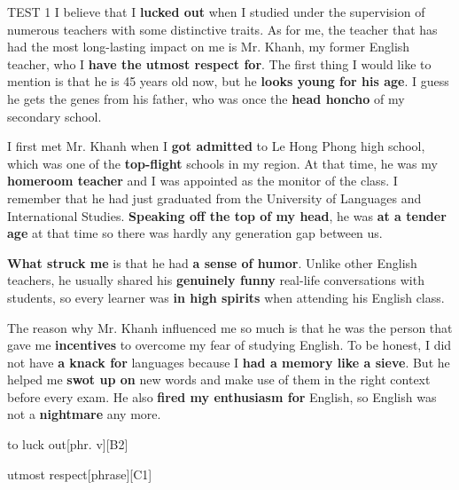 \begin{glossarymc}[Cambridge 3]
\begin{test}{TEST 1}
I believe that I \textbf{lucked out} when I studied under the supervision of numerous teachers with some distinctive traits. 
As for me, the teacher that has had the most long-lasting impact on me is Mr. Khanh, my former English teacher, who I \textbf{have the utmost respect for}. 
The first thing I would like to mention is that he is 45 years old now, but he \textbf{looks young for his age}. 
I guess he gets the genes from his father, who was once the \textbf{head honcho} of my secondary school.  

I first met Mr. Khanh when I \textbf{got admitted} to Le Hong Phong high school, which was one of the \textbf{top-flight} schools in my region. 
At that time, he was my \textbf{homeroom teacher} and I was appointed as the monitor of the class. 
I remember that he had just graduated from the University of Languages and International Studies. 
\textbf{Speaking off the top of my head}, he was \textbf{at a tender age} at that time so there was hardly any generation gap between us.  

\textbf{What struck me} is that he had \textbf{a sense of humor}. 
Unlike other English teachers, he usually shared his \textbf{genuinely funny} real-life conversations with students, so every learner was \textbf{in high spirits} when attending his English class.  

The reason why Mr. Khanh influenced me so much is that he was the person that gave me \textbf{incentives} to overcome my fear of studying English. 
To be honest, I did not have \textbf{a knack for} languages because I \textbf{had a memory like a sieve}. 
But he helped me \textbf{swot up on} new words and make use of them in the right context before every exam. 
He also \textbf{fired my enthusiasm for} English, so English was not a \textbf{nightmare} any more.


\begin{VocabExplain}[Part 2]
    \begin{ExplainCard}{to luck out}[phr. v][B2]
\end{ExplainCard}

\begin{ExplainCard}{utmost respect}[phrase][C1]
\end{ExplainCard}


\end{VocabExplain}
\end{test}
\end{glossarymc}
